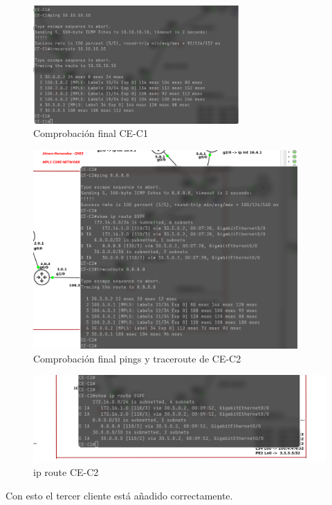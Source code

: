 \documentclass{article}
\begin{document}
\begin{figure}[h]
    \centering
    \includegraphics[width=0.7\textwidth]{src/comprobacionC1.png}
    \caption{Comprobación final CE-C1 }
\end{figure}
\begin{figure}[h]
    \centering
    \includegraphics[width=0.9\textwidth]{src/comprobacionC2.png}
    \caption{Comprobación final pings y traceroute de CE-C2}
\end{figure}
\newpage
\begin{figure}[h]
    \centering
    \includegraphics[width=1\textwidth]{src/iproutec2.png}
    \caption{ip route CE-C2}
\end{figure}

Con esto el tercer cliente está añadido correctamente.
\end{document}
